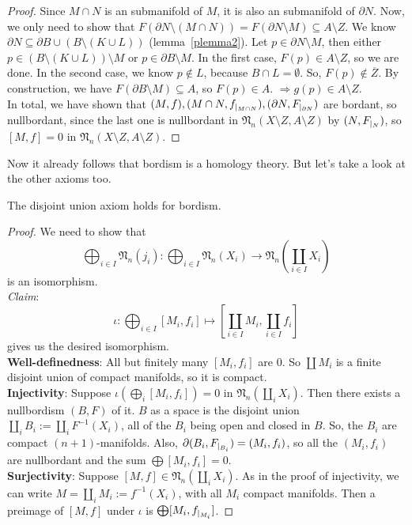 \documentclass[a4paper,11pt]{article}
\begin{document}
\begin{proof}
    Since \(M\cap N\) is an submanifold of \(M\), it is also an submanifold of \(\partial N\). 
    Now, we only need to show that \(F(\partial N\setminus(M\cap N))=F(\partial N\setminus M)\subseteq A\setminus Z\). 
    We know \(\partial N\subseteq\partial B\cup(B\setminus(K\cup L))\) (lemma\ \ref{plemma2}). 
    Let \(p\in\partial N\setminus M\), then either \(p\in(B\setminus(K\cup L))\setminus M\) or \(p\in\partial B\setminus M\). In the first case, \(F(p)\in A\setminus Z\), so we are done. 
    In the second case, we know \(p\notin L\), because \(B\cap L=\emptyset\). So, \(F(p)\notin\overline{Z}\). By construction, we have \(F(\partial B\setminus M)\subseteq A\), so \(F(p)\in A\). \(\Rightarrow g(p)\in A\setminus Z\).\\
    In total, we have shown that \((M,f), (M\cap N,f_{|_{M\cap N}}), (\partial N,F_{|_{\partial N}})\) are bordant, so nullbordant, since the last one is nullbordant in \(\mathfrak{N}_n(X\setminus Z,A\setminus Z)\) by \((N,F_{|_{N}})\), so \([M,f]=0\) in \(\mathfrak N_n(X\setminus Z,A\setminus Z)\).
\end{proof}

Now it already follows that bordism is a homology theory. But let's take a look at the other axioms too.

\begin{lemma}\label{disjoint union}
    The disjoint union axiom holds for bordism.
\end{lemma}

\begin{proof}\cite{zhang}
    We need to show that 
    \[\bigoplus_{i\in I}\mathfrak{N}_n(j_i):\bigoplus_{i\in I}\mathfrak{N}_n(X_i)\to\mathfrak{N}_n\left(\coprod_{i\in I}X_i\right)\] 
    is an isomorphism.\\
    \textit{Claim}: \[\iota:\bigoplus_{i\in I}[M_i,f_i]\mapsto \left[\coprod_{i\in I}M_i,\coprod_{i\in I} f_i\right]\]
    gives us the desired isomorphism.\\
    \textbf{Well-definedness}: All but finitely many \([M_i,f_i]\) are \(0\). So \(\coprod M_i\) is a finite disjoint union of compact manifolds, so it is compact.\\
    \textbf{Injectivity}: Suppose \(\iota\left(\bigoplus_i[M_i,f_i]\right)=0\) in \(\mathfrak{N}_n(\coprod_i X_i)\). Then there exists a nullbordism \((B,F)\) of it. \(B\) as a space is the disjoint union \(\coprod_i B_i:=\coprod_i F^{-1}(X_i)\), all of the \(B_i\) being open and closed in \(B\). So, the \(B_i\) are compact \((n+1)\)-manifolds. Also, \(\partial(B_i,F_{|_{B_i}})=(M_i,f_i)\), so all the \((M_i,f_i)\) are nullbordant and the sum \(\bigoplus[M_i,f_i]=0\).
    \\
    \textbf{Surjectivity}: Suppose \([M,f]\in\mathfrak{N}_n(\coprod_i X_i)\). As in the proof of injectivity, we can write \(M=\coprod_i M_i:=f^{-1}(X_i)\), with all \(M_i\) compact manifolds. Then a preimage of \([M,f]\) under \(\iota\) is \(\bigoplus[M_i,f_{|_{M_i}}]\).
\end{proof}
\end{document}
